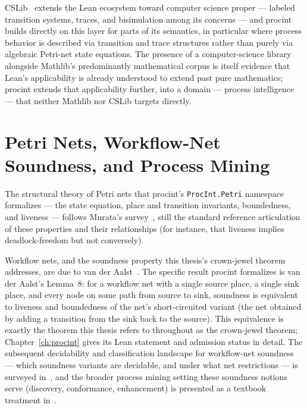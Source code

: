 CSLib~\cite{cslib2026} extends the Lean ecosystem toward computer
science proper --- labeled transition systems, traces, and bisimulation
among its concerns --- and \textsf{procint} builds directly on this layer
for parts of its semantics, in particular where process behavior is
described via transition and trace structures rather than purely via
algebraic Petri-net state equations. The presence of a computer-science
library alongside Mathlib's predominantly mathematical corpus is itself
evidence that Lean's applicability is already understood to extend past
pure mathematics; \textsf{procint} extends that applicability further,
into a domain --- process intelligence --- that neither Mathlib nor
CSLib targets directly.

\section{Petri Nets, Workflow-Net Soundness, and Process Mining}

The structural theory of Petri nets that \textsf{procint}'s
\texttt{ProcInt.Petri} namespace formalizes --- the state equation,
place and transition invariants, boundedness, and liveness --- follows
Murata's survey~\cite{murata1989}, still the standard reference
articulation of these properties and their relationships (for instance,
that liveness implies deadlock-freedom but not conversely).

Workflow nets, and the soundness property this thesis's crown-jewel
theorem addresses, are due to van der Aalst~\cite{vanderaalst1997}. The
specific result \textsf{procint} formalizes is van der Aalst's Lemma~8:
for a workflow net with a single source place, a single sink place, and
every node on some path from source to sink, soundness is equivalent to
liveness and boundedness of the net's short-circuited variant (the net
obtained by adding a transition from the sink back to the source). This
equivalence is exactly the theorem this thesis refers to throughout as
the crown-jewel theorem; Chapter~\ref{ch:procint} gives its Lean
statement and admission status in detail. The subsequent decidability
and classification landscape for workflow-net soundness --- which
soundness variants are decidable, and under what net restrictions --- is
surveyed in~\cite{vanderaalst2011soundness}, and the broader process
mining setting these soundness notions serve (discovery, conformance,
enhancement) is presented as a textbook treatment
in~\cite{vanderaalst2011pm}.

